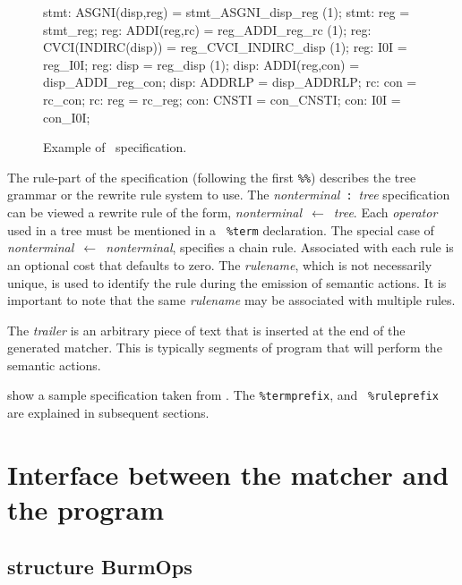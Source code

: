 \begin{figure}
\small
\begin{centercode}
stmt:   ASGNI(disp,reg)         = stmt_ASGNI_disp_reg   (1);
stmt:   reg                     = stmt_reg;
reg:    ADDI(reg,rc)            = reg_ADDI_reg_rc       (1);
reg:    CVCI(INDIRC(disp))      = reg_CVCI_INDIRC_disp  (1);
reg:    I0I                     = reg_I0I;
reg:    disp                    = reg_disp              (1);
disp:   ADDI(reg,con)           = disp_ADDI_reg_con;
disp:   ADDRLP                  = disp_ADDRLP;
rc:     con                     = rc_con;
rc:     reg                     = rc_reg;
con:    CNSTI                   = con_CNSTI;
con:    I0I                     = con_I0I;
\end{centercode}
 \caption{Example of \mlburg\ specification.}
 \label{f:ex_spec}
\end{figure}

The rule-part of the specification (following the first {\tt \%\%})
describes the tree grammar or the rewrite rule system to use. The 
\mbox{{\sl nonterminal} {\tt :} {\it tree}} specification can be viewed a
rewrite rule of the form, \mbox{{\sl nonterminal} $\leftarrow$ {\it tree}}.
Each {\sl operator} used in a tree must be mentioned in a {\tt
\%term} declaration. The special case of \mbox{\sl nonterminal
$\leftarrow$ nonterminal}, specifies a chain rule. Associated with
each rule is an optional cost that defaults to zero. The {\sl
rulename}, which is not necessarily unique, is used to identify the
rule during the emission of semantic actions. It is important to note
that the same {\sl rulename} may be associated with multiple rules.

The {\sl trailer} is an arbitrary piece of text that is inserted at
the end of the generated matcher. This is typically segments of
program that will perform the semantic actions.

 show a sample specification taken from
\cite{fraser-hanson-proebsting-92}. The {\tt \%termprefix}, and {\tt
\%ruleprefix} are explained in subsequent sections.


		\section{Interface between the matcher and the program}

	\subsection{structure BurmOps}

